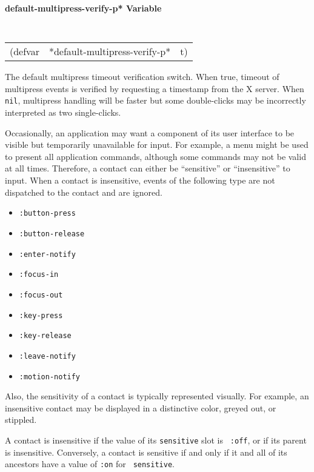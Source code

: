 {\samepage
{\large {\bf *default-multipress-verify-p* \hfill Variable}} 
\begin{flushright} \parbox[t]{6.125in}{
\tt
\begin{tabular}{lll}
\raggedright
(defvar & *default-multipress-verify-p* & t)
\end{tabular}
\rm

}\end{flushright}}

\begin{flushright} \parbox[t]{6.125in}{
The default multipress timeout verification switch.  When true, timeout
of multipress events is verified by requesting a
timestamp from the X server.  When {\tt nil}, multipress handling will
be faster but some double-clicks may be incorrectly interpreted as two
single-clicks.

}\end{flushright}

Occasionally, an application may want a component of its user interface to be
visible but temporarily unavailable for input. For example, a menu might be used
to present all application commands, although some commands may
not be valid at all times.
Therefore, a contact can either be ``sensitive'' or ``insensitive'' to input.
When a contact is insensitive, events of the following type are not dispatched
to the contact and are ignored.
\begin{itemize}
\item {\tt :button-press}
\item {\tt :button-release}
\item {\tt :enter-notify}
\item {\tt :focus-in}
\item {\tt :focus-out}
\item {\tt :key-press}
\item {\tt :key-release}
\item {\tt :leave-notify}
\item {\tt :motion-notify}
\end{itemize}
Also, the sensitivity of a contact is typically represented visually. For
example, an insensitive contact may be displayed in a distinctive color, greyed
out, or stippled.

A contact is insensitive if the value of its {\tt sensitive} slot is {\tt
:off}, or if its parent is insensitive. Conversely, a contact is sensitive if and
only if it and all of its ancestors have a   value  of {\tt :on} for {\tt
sensitive}.

